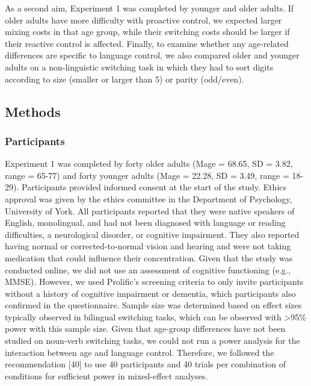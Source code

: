 \documentclass[
]{article}
\begin{document}
As a second aim, Experiment 1 was completed by younger and older adults. If older adults have more difficulty with proactive control, we expected larger mixing costs in that age group, while their switching costs should be larger if their reactive control is affected. Finally, to examine whether any age-related differences are specific to language control, we also compared older and younger adults on a non-linguistic switching task in which they had to sort digits according to size (smaller or larger than 5) or parity (odd/even).

\hypertarget{methods}{%
\subsection{Methods}\label{methods}}

\hypertarget{participants}{%
\subsubsection{Participants}\label{participants}}

Experiment 1 was completed by forty older adults (Mage = 68.65, SD = 3.82, range = 65-77) and forty younger adults (Mage = 22.28, SD = 3.49, range = 18-29). Participants provided informed consent at the start of the study. Ethics approval was given by the ethics committee in the Department of Psychology, University of York. All participants reported that they were native speakers of English, monolingual, and had not been diagnosed with language or reading difficulties, a neurological disorder, or cognitive impairment. They also reported having normal or corrected-to-normal vision and hearing and were not taking medication that could influence their concentration. Given that the study was conducted online, we did not use an assessment of cognitive functioning (e.g., MMSE). However, we used Prolific's screening criteria to only invite participants without a history of cognitive impairment or dementia, which participants also confirmed in the questionnaire. Sample size was determined based on effect sizes typically observed in bilingual switching tasks, which can be observed with \textgreater95\% power with this sample size. Given that age-group differences have not been studied on noun-verb switching tasks, we could not run a power analysis for the interaction between age and language control. Therefore, we followed the recommendation {[}40{]} to use 40 participants and 40 trials per combination of conditions for sufficient power in mixed-effect analyses.
\end{document}
